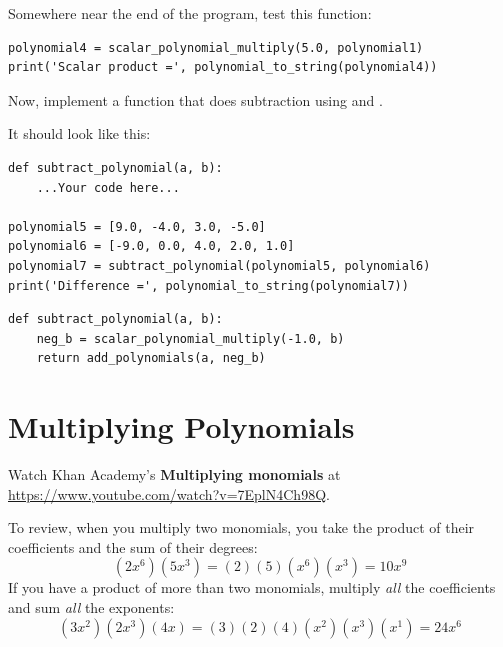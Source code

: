 Somewhere near the end of the program, test this function:
\begin{verbatim}
polynomial4 = scalar_polynomial_multiply(5.0, polynomial1)
print('Scalar product =', polynomial_to_string(polynomial4))
\end{verbatim}

\begin{Exercise}[title=Subtract polynomials in Python, label=pysubpoly]
Now, implement a function that does subtraction using
 and
.

It should look like this:
\begin{verbatim}
def subtract_polynomial(a, b):
    ...Your code here...

polynomial5 = [9.0, -4.0, 3.0, -5.0]
polynomial6 = [-9.0, 0.0, 4.0, 2.0, 1.0]
polynomial7 = subtract_polynomial(polynomial5, polynomial6)
print('Difference =', polynomial_to_string(polynomial7))
\end{verbatim}
\end{Exercise}
\begin{Answer}[ref=pysubpoly]
\begin{verbatim}
def subtract_polynomial(a, b):
    neg_b = scalar_polynomial_multiply(-1.0, b)
    return add_polynomials(a, neg_b)
\end{verbatim}
\end{Answer}


    


\section{Multiplying Polynomials}
Watch Khan Academy's \textbf{Multiplying monomials} at \url{https://www.youtube.com/watch?v=7EplN4Ch98Q}.

To review, when you multiply two monomials, you take the product of
their coefficients and the sum of their degrees:
\begin{equation*}
  (2x^6)(5x^3) = (2)(5)(x^6)(x^3) = 10x^9
\end{equation*}
If you have a product of more than two monomials, multiply \emph{all}
the coefficients and sum \emph{all} the exponents:
\begin{equation*}
  (3x^2)(2x^3)(4x) = (3)(2)(4)(x^2)(x^3)(x^1) = 24x^6
\end{equation*}

